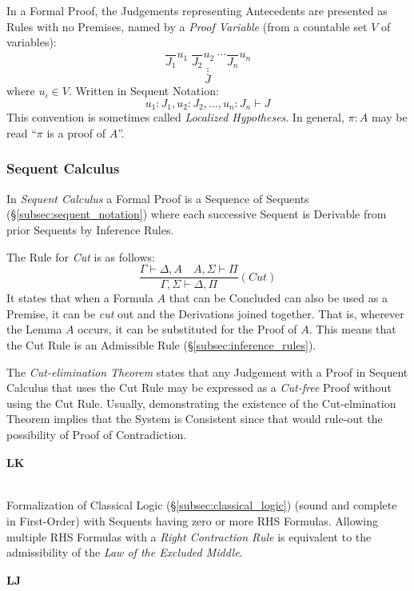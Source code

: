 \documentclass{article}
\begin{document}
In a Formal Proof, the Judgements representing Antecedents are
presented as Rules with no Premises, named by a \emph{Proof Variable}
(from a countable set $V$ of variables):
\[
    \frac{}{J_1}u_1 \; \frac{}{J_2}u_2 \; \cdots \frac{}{J_n}u_n
\]\[
    \vdots
\]\[
    J
\]
where $u_i \in V$. Written in Sequent Notation:
\[
    u_1:J_1, u_2:J_2, \ldots, u_n:J_n \vdash J
\]
This convention is sometimes called \emph{Localized Hypotheses}. In
general, $\pi : A$ may be read ``$\pi$ is a proof of $A$''.

\subsubsection{Sequent Calculus}

In \emph{Sequent Calculus} a Formal Proof is a Sequence of Sequents
(\S\ref{subsec:sequent_notation}) where each successive Sequent is
Derivable from prior Sequents by Inference Rules.

The Rule for \emph{Cut} is as follows:
\[
    \frac{
        \Gamma \vdash \Delta, A \quad A, \Sigma \vdash \Pi
    }{
        \Gamma, \Sigma \vdash \Delta, \Pi
    }(Cut)
\]
It states that when a Formula $A$ that can be Concluded can also be
used as a Premise, it can be \emph{cut} out and the Derivations joined
together. That is, wherever the Lemma $A$ occurs, it can be
substituted for the Proof of $A$. This means that the Cut Rule is an
Admissible Rule (\S\ref{subsec:inference_rules}).

The \emph{Cut-elimination Theorem} states that any Judgement with a
Proof in Sequent Calculus that uses the Cut Rule may be expressed as a
\emph{Cut-free} Proof without using the Cut Rule. Usually,
demonstrating the existence of the Cut-elmination Theorem implies that
the System is Consistent since that would rule-out the possibility of
Proof of Contradiction.

\paragraph{$\mathbf{LK}$} \hfill \\

Formalization of Classical Logic (\S\ref{subsec:classical_logic})
(sound and complete in First-Order) with Sequents having zero or more
RHS Formulas. Allowing multiple RHS Formulas with a \emph{Right
  Contraction Rule} is equivalent to the admissibility of the
\emph{Law of the Excluded Middle}.

\paragraph{$\mathbf{LJ}$} \hfill \\
\end{document}
